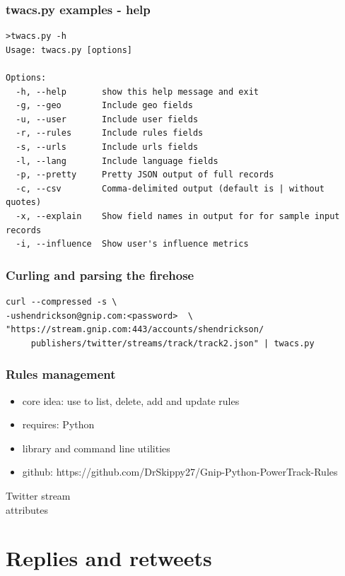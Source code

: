 \documentclass{beamer}
\begin{document}
\begin{frame}[fragile]
\frametitle{twacs.py examples - help}
\begin{verbatim}
>twacs.py -h
Usage: twacs.py [options]

Options:
  -h, --help       show this help message and exit
  -g, --geo        Include geo fields
  -u, --user       Include user fields
  -r, --rules      Include rules fields
  -s, --urls       Include urls fields
  -l, --lang       Include language fields
  -p, --pretty     Pretty JSON output of full records
  -c, --csv        Comma-delimited output (default is | without quotes)
  -x, --explain    Show field names in output for for sample input records
  -i, --influence  Show user's influence metrics
\end{verbatim}
\end{frame}


\begin{frame}[fragile]
\frametitle{Curling and parsing the firehose}
\begin{verbatim}
curl --compressed -s \
-ushendrickson@gnip.com:<password>  \
"https://stream.gnip.com:443/accounts/shendrickson/
     publishers/twitter/streams/track/track2.json" | twacs.py
\end{verbatim}
\end{frame}


\begin{frame}\frametitle{Rules management}
\begin{itemize}
\item core idea: use to list, delete, add  and update rules
\item requires: Python
\item library and command line utilities
\item github: https://github.com/DrSkippy27/Gnip-Python-PowerTrack-Rules
\end{itemize}
\end{frame}

{
\begin{frame}[fragile]
\Huge{\color{black}Twitter stream \\ [10pt] attributes}
\end{frame}
}

\section{Replies and retweets}
\end{document}

